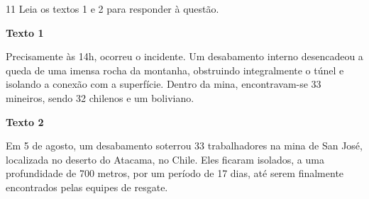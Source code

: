 \num{11} Leia os textos 1 e 2 para responder à questão. 

\begin{myquote}

\textbf{Texto 1}

Precisamente às 14h, ocorreu o incidente. Um desabamento interno desencadeou a
queda de uma imensa rocha da montanha, obstruindo integralmente o túnel e
isolando a conexão com a superfície. Dentro da mina, encontravam-se 33
mineiros, sendo 32 chilenos e um boliviano.


\end{myquote}


\begin{myquote}

\textbf{Texto 2}

Em 5 de agosto, um desabamento soterrou 33 trabalhadores na mina de San José,
localizada no deserto do Atacama, no Chile. Eles ficaram isolados, a uma
profundidade de 700 metros, por um período de 17 dias, até serem finalmente
encontrados pelas equipes de resgate.


\end{myquote}


\renewcommand{\fonte}[1]{}

